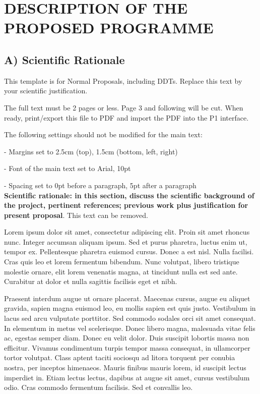 \documentclass{article}
\begin{document}
\section{DESCRIPTION OF THE PROPOSED PROGRAMME}
\subsection{A) Scientific Rationale}

This template is for Normal Proposals, including DDTs. Replace this text by your scientific justification. 

The full text must be 2 pages or less. Page 3 and following will be cut. When ready, print/export this file to PDF and import the PDF into the P1 interface. 

The following settings should not be modified for the main text:

- Margins set to 2.5cm (top), 1.5cm (bottom, left, right)

- Font of the main text set to Arial, 10pt

- Spacing set to 0pt before a paragraph, 5pt after a paragraph\\


{\bf Scientific rationale: in this section, discuss the scientific background of  the project, pertinent references; previous work plus justification for present proposal}. This text can be removed.

Lorem ipsum dolor sit amet, consectetur adipiscing elit. Proin sit amet rhoncus nunc. Integer accumsan aliquam ipsum. Sed et purus pharetra, luctus enim ut, tempor ex. Pellentesque pharetra euismod cursus. Donec a est nisl. Nulla facilisi. Cras quis leo et lorem fermentum bibendum. Nunc volutpat, libero tristique molestie ornare, elit lorem venenatis magna, at tincidunt nulla est sed ante. Curabitur at dolor et nulla sagittis facilisis eget et nibh.

Praesent interdum augue ut ornare placerat. Maecenas cursus, augue eu aliquet gravida, sapien magna euismod leo, eu mollis sapien est quis justo. Vestibulum in lacus sed arcu vulputate porttitor. Sed commodo sodales orci sit amet consequat. In elementum in metus vel scelerisque. Donec libero magna, malesuada vitae felis ac, egestas semper diam. Donec eu velit dolor. Duis suscipit lobortis massa non efficitur. Vivamus condimentum turpis tempor massa consequat, in ullamcorper tortor volutpat. Class aptent taciti sociosqu ad litora torquent per conubia nostra, per inceptos himenaeos. Mauris finibus mauris lorem, id suscipit lectus imperdiet in. Etiam lectus lectus, dapibus at augue sit amet, cursus vestibulum odio. Cras commodo fermentum facilisis. Sed et convallis leo.
\end{document}
